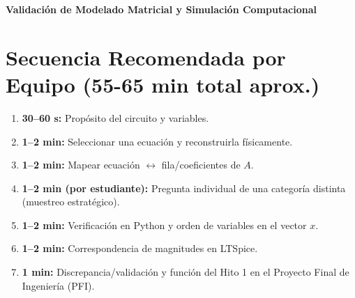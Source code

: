 \documentclass[11pt, a4paper]{article}
\begin{document}
\begin{tcolorbox}[colback=ucbblue!5!white, colframe=ucbblue, title=\textbf{Hoja de Ruta y Diagnóstico: Defensa del Hito 1}]
    \centering \large \textbf{Validación de Modelado Matricial y Simulación Computacional}
\end{tcolorbox}

\section*{Secuencia Recomendada por Equipo (55-65 min total aprox.)}
\begin{enumerate}
    \item \textbf{30--60 s:} Propósito del circuito y variables.
    \item \textbf{1--2 min:} Seleccionar una ecuación y reconstruirla físicamente.
    \item \textbf{1--2 min:} Mapear ecuación $\leftrightarrow$ fila/coeficientes de $A$.
    \item \textbf{1--2 min (por estudiante):} Pregunta individual de una categoría distinta (muestreo estratégico).
    \item \textbf{1--2 min:} Verificación en Python y orden de variables en el vector $x$.
    \item \textbf{1--2 min:} Correspondencia de magnitudes en LTSpice.
    \item \textbf{1 min:} Discrepancia/validación y función del Hito 1 en el Proyecto Final de Ingeniería (PFI).
\end{enumerate}
\end{document}
